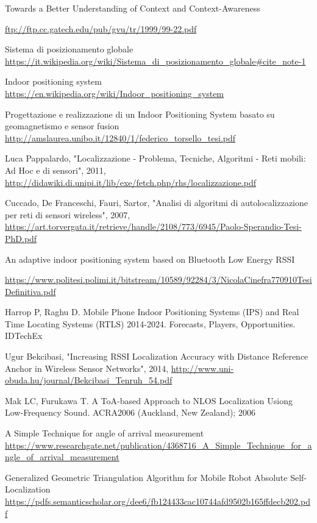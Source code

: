 \begin{thebibliography}{99}

Towards a Better Understanding of Context and Context-Awareness
\author{Anind K. Dey, Gregory D. Abowd}
\url{ftp://ftp.cc.gatech.edu/pub/gvu/tr/1999/99-22.pdf}

Sistema di posizionamento globale
\url{https://it.wikipedia.org/wiki/Sistema_di_posizionamento_globale#cite_note-1}


Indoor positioning system
\url{https://en.wikipedia.org/wiki/Indoor_positioning_system}

Progettazione e realizzazione di un Indoor Positioning System basato su geomagnetismo e sensor fusion
\url{http://amslaurea.unibo.it/12840/1/federico_torsello_tesi.pdf}

Luca Pappalardo, "Localizzazione - Problema, Tecniche, Algoritmi - Reti mobili:
Ad Hoc e di sensori", 2011,
\url{http://didawiki.di.unipi.it/lib/exe/fetch.php/rhs/localizzazione.pdf}

Cuccado, De Franceschi, Fauri, Sartor, "Analisi di algoritmi di autolocalizzazione
per reti di sensori wireless", 2007,
\url{https://art.torvergata.it/retrieve/handle/2108/773/6945/Paolo-Sperandio-Tesi-PhD.pdf}

An adaptive indoor positioning system based on Bluetooth Low Energy RSSI
\author{Nicola Cinefra}
\url{https://www.politesi.polimi.it/bitstream/10589/92284/3/NicolaCinefra770910TesiDefinitiva.pdf}

Harrop P, Raghu D. Mobile Phone Indoor Positioning Systems (IPS) and Real Time
Locating Systems (RTLS) 2014-2024. Forecasts, Players, Opportunities. IDTechEx



Ugur Bekcibasi, "Increasing RSSI Localization Accuracy with Distance Reference
Anchor in Wireless Sensor Networks", 2014,
\url{http://www.uni-obuda.hu/journal/Bekcibasi_Tenruh_54.pdf}

Mak LC, Furukawa T. A ToA-based Approach to NLOS Localization Usiong Low-Frequency Sound. ACRA2006 (Auckland, New Zealand); 2006


A Simple Technique for angle of arrival measurement
\url{https://www.researchgate.net/publication/4368716_A_Simple_Technique_for_angle_of_arrival_measurement}

Generalized Geometric Triangulation Algorithm for Mobile Robot
Absolute Self-Localization 
\url{https://pdfs.semanticscholar.org/dee6/fb124433cac10744afd9502b165ffdecb202.pdf}


\end{thebibliography}
